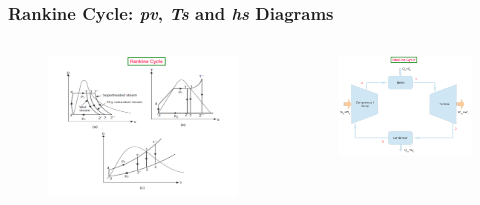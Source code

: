 \documentclass[10pt,compress,handout,ignorenonframetext]{beamer}
\begin{document}
\begin{frame}
 \frametitle{Rankine Cycle: {\it pv}, {\it Ts} and {\it hs} Diagrams}
 \begin{columns}
   \begin{column}[c]{0.55\linewidth}
    \begin{figure}%
     \begin{center}
      \includegraphics[width=7.5cm,clip]{./Pics/Simple_Rankine_Cycle_Diagrams}
     \end{center}
    \end{figure}  
   \end{column}
   \begin{column}[l]{0.45\linewidth}
    \begin{figure}%
     \begin{center}
      \includegraphics[width=5.5cm,clip]{./Pics/Simple_Rankine_Cycle}
     \end{center}
    \end{figure} 
   \end{column}
  \end{columns}
\end{frame}
\end{document}
